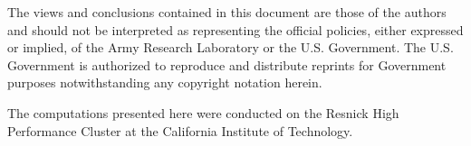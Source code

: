 \documentclass[twoside,11pt]{article}
\begin{document}
The views and conclusions contained in this document are those of the authors and should not be interpreted as representing the official policies, either expressed or implied, of the Army Research Laboratory or the U.S. Government. The U.S. Government is authorized to reproduce and distribute reprints for Government purposes notwithstanding any copyright notation herein. 

The computations presented here were conducted on the Resnick High Performance Cluster at the California Institute of Technology.


% 

\newpage















\newpage
\onecolumn
\appendix


\end{document}
